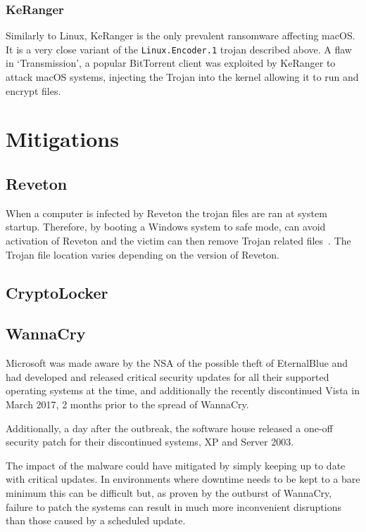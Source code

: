 \documentclass[10pt,a4paper]{article}
\begin{document}
\subsubsection{KeRanger}

Similarly to Linux, KeRanger is the only prevalent ransomware affecting macOS. It is a very close variant of the \texttt{Linux.Encoder.1} trojan described above. A flaw in `Transmission', a popular BitTorrent client was exploited by KeRanger to attack macOS systems, injecting the Trojan into the kernel allowing it to run and encrypt files.

\section{Mitigations} \label{sec:mitigations}

\subsection{Reveton}
When a computer is infected by Reveton the trojan files are ran at system startup. Therefore, by booting a Windows system to safe mode, can avoid activation of Reveton and the victim can then remove Trojan related files~\cite{revetonremoval}. The Trojan file location varies depending on the version of Reveton.

\subsection{CryptoLocker}

\subsection{WannaCry}

Microsoft was made aware by the NSA of the possible theft of EternalBlue and had developed and released critical security updates for all their supported operating systems at the time, and additionally the recently discontinued Vista in March 2017, 2 months prior to the spread of WannaCry.

Additionally, a day after the outbreak, the software house released a one-off security patch for their discontinued systems, XP and Server 2003.

The impact of the malware could have mitigated by simply keeping up to date with critical updates. In environments where downtime needs to be kept to a bare minimum this can be difficult but, as proven by the outburst of WannaCry, failure to patch the systems can result in much more inconvenient disruptions than those caused by a scheduled update.
\end{document}
